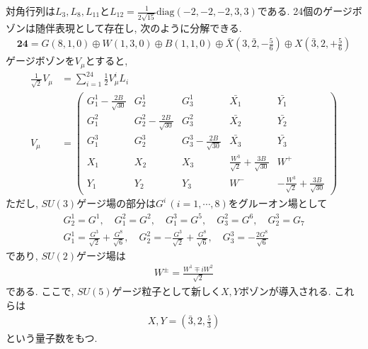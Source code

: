 \documentclass[uplatex,dvipdfmx,a4paper,titlepage]{jsbook}
\theoremstyle{plain}
\theoremstyle{definition}
\begin{document}
{対角行列は$L_3, L_8, L_{11}$と$L_{12}=\frac{1}{2\sqrt{15}}\mathrm{diag}(-2,-2,-2,3,3)$である.
24個のゲージボゾンは随伴表現として存在し, 次のように分解できる.
\begin{align}
  \bm{24} = G(8,1,0)\oplus W(1,3,0)\oplus B(1,1,0)\oplus \bar{X}(3,\bar{2},-\frac{5}{6})\oplus X(\bar{3},2,+\frac{5}{6})
\end{align}
ゲージボゾンを$V_\mu$とすると,
\begin{align}
  \frac{1}{\sqrt{2}}V_\mu &= \sum_{i=1}^{24}\frac{1}{2}V_\mu^i L_i\\
  V_\mu &= \left(\begin{array}{ccccc}
    G^1_1 - \frac{2B}{\sqrt{30}} & G^1_2 & G^1_3 & \bar{X_1} & \bar{Y_1} \\
    G^2_1 & G^2_2 - \frac{2B}{\sqrt{30}} & G^2_3 & \bar{X_2} & \bar{Y_2} \\
    G^3_1 & G^3_2 & G^3_3 - \frac{2B}{\sqrt{30}} & \bar{X_3} & \bar{Y_3} \\
    X_1   & X_2 & X_3 & \frac{W^3}{\sqrt{2}} + \frac{3B}{\sqrt{30}} & W^+ \\
    Y_1   & Y_2 & Y_3 & W^- &    -\frac{W^3}{\sqrt{2}} + \frac{3B}{\sqrt{30}} 
      \end{array}
  \right)
\end{align}
ただし, $SU(3)$ゲージ場の部分は$G^i\,(i=1,\cdots,8)$をグルーオン場として
\begin{align}
  G^1_2 = G^1,\quad G^2_1 = G^2,\quad G^3_1 = G^5,\quad G^2_3 = G^6,\quad G^3_2 = G_7\nonumber\\
  G^1_1 = \frac{G^3}{\sqrt{2}} + \frac{G^8}{\sqrt{6}},\quad G^2_2=-\frac{G^3}{\sqrt{2}}+\frac{G^8}{\sqrt{6}},\quad G^3_3 = -\frac{2G^8}{\sqrt{6}}\nonumber
\end{align}
であり, $SU(2)$ゲージ場は
\begin{align}
  W^\pm = \frac{W^1\mp iW^2}{\sqrt{2}}\nonumber
\end{align}
である.
ここで, $SU(5)$ゲージ粒子として新しく$X, Y$ボゾンが導入される.
これらは
\begin{align}
  X, Y = \left(\bar{3},2, \frac{5}{3}\right)\label{XY_bosons}
\end{align}
という量子数をもつ.

}
\end{document}
